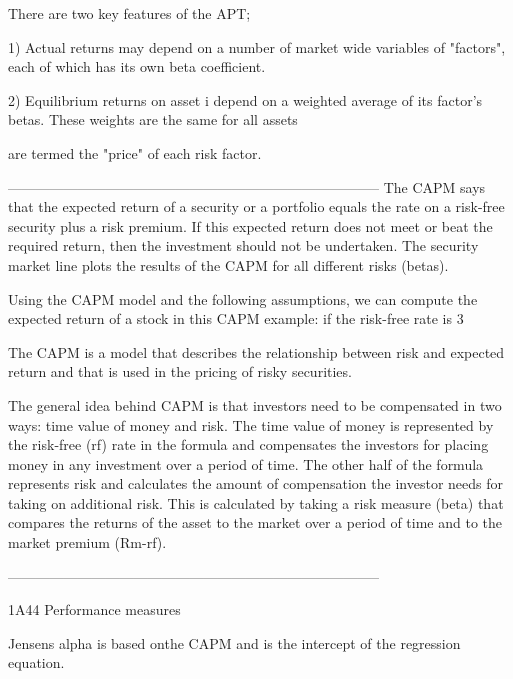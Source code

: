 There are two key features of the APT;

1) Actual returns may depend on a number of market wide variables of "factors", each of which has its own beta coefficient.


2) Equilibrium returns on asset i depend on a weighted average of its factor's betas. These weights \lambda are the same for all assets

 are termed the "price" of each risk factor. 





--------------------------------------------------------------------------------
The CAPM says that the expected return of a security or a portfolio equals the rate on a risk-free security plus a risk premium. If this expected return does not meet or beat the required return, then the investment should not be undertaken. The security market line plots the results of the CAPM for all different risks (betas).


Using the CAPM model and the following assumptions, we can compute the expected return of a stock in this CAPM example: if the risk-free rate is 3%


The CAPM is a model that describes the relationship between risk and expected return and that is used in the pricing of risky securities.




 


The general idea behind CAPM is that investors need to be compensated in two ways: time value of money and risk. The time value of money is represented by the risk-free (rf) rate in the formula and compensates the investors for placing money in any investment over a period of time. The other half of the formula represents risk and calculates the amount of compensation the investor needs for taking on additional risk. This is calculated by taking a risk measure (beta) that compares the returns of the asset to the market over a period of time and to the market premium (Rm-rf).




--------------------------------------------------------------------------------


1A44
Performance measures

Jensens alpha is based onthe CAPM and is the intercept of the regression equation.
